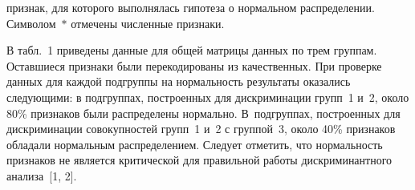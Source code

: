 \begin{multicols}{2}
\vspace*{6pt}


\addtocounter{table}{1}  

\noindent
 признак, для которого выполнялась гипотеза о нормальном
распределении. Символом~$\ast$  отмечены численные признаки.



В табл.~1 приведены данные для общей матрицы данных по
трем группам. Оставшиеся признаки были перекодированы из
качественных. При проверке данных для каждой подгруппы на
нормальность результаты оказались следующими: в подгруппах,
построенных для дискриминации групп~1 и~2, около 80\%  признаков
были распределены нормально. В~подгруппах, построенных для
дискриминации совокупностей групп~1 и~2 с группой~3, около 40\%
признаков обладали нормальным распределением. Следует отметить, что
нормальность признаков не является критической для правильной работы
дискриминантного анализа~[1, 2].

\setcounter{table}{2}
 \begin{table*}[b]\small
 \vspace*{-12pt}
\begin{center}
        \label{tabl4}
        \vspace*{2ex}
        

\end{center}
\end{table*}
\end{multicols}

